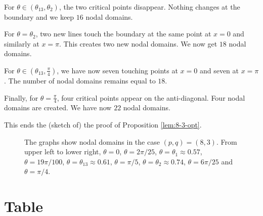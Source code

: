 \documentclass[a4paper,reqno,11pt]{amsart}
\theoremstyle{remark}
\theoremstyle{definition}
\numberwithin{equation}{section}
\begin{document}
For $\theta \in ( \theta_{13}, \theta_2)$, the two critical points disappear.
Nothing changes at the boundary and we keep $16$ nodal domains.
 
 For $\theta = \theta_2$, two new lines touch the boundary at the same point 
at $x=0$ and similarly at $x=\pi$. This creates two new nodal domains. We now 
get $18$ nodal domains.
 
  For $\theta \in (\theta_{13},\frac \pi 4)$, we have now seven touching 
points at $x=0$ and seven at $x=\pi$. The number of nodal domains remains 
equal to $18$.
  
  Finally, for $\theta=\frac \pi 4$, four critical points appear on the 
anti-diagonal. Four nodal domains are created. We have now $22$ nodal domains.

This ends the (sketch of) the proof of Proposition \ref{lem:8-3-opt}.

\begin{figure}[htp]
\centering
{}
\vskip 0.5cm
\vskip 0.5cm
\caption{The graphs show nodal domains in the case $(p,q)=(8,3)$. From upper 
left to lower right, $\theta=0$, $\theta=2\pi/25$, $\theta=\theta_1\approx 0.57$, 
$\theta=19\pi/100$, $\theta=\theta_{13}\approx 0.61$, $\theta=\pi/5$, 
$\theta=\theta_2\approx 0.74$, $\theta=6\pi/25$ and $\theta=\pi/4$.}
\label{fig:8-3}
\end{figure}

\section{Table}
\label{sec:table}
\end{document}

